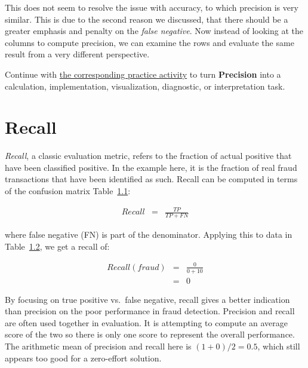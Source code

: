 \documentclass[
  letterpaper,
]{scrbook}
\begin{document}
This does not seem to resolve the issue with accuracy, to which
precision is very similar. This is due to the second reason we
discussed, that there should be a greater emphasis and penalty on the
\emph{false negative}. Now instead of looking at the columns to compute
precision, we can examine the rows and evaluate the same result from a
very different perspective.

\begin{tcolorbox}[enhanced jigsaw, arc=.35mm, bottomrule=.15mm, bottomtitle=1mm, breakable, colback=white, colbacktitle=quarto-callout-tip-color!10!white, colframe=quarto-callout-tip-color-frame, coltitle=black, left=2mm, leftrule=.75mm, opacityback=0, opacitybacktitle=0.6, rightrule=.15mm, title=\textcolor{quarto-callout-tip-color}{\faLightbulb}\hspace{0.5em}{Put it into practice}, titlerule=0mm, toprule=.15mm, toptitle=1mm]

Continue with \hyperref[sec-pr-14-precision]{the corresponding practice
activity} to turn \textbf{Precision} into a calculation, implementation,
visualization, diagnostic, or interpretation task.

\end{tcolorbox}

\section{Recall}\label{recall}

\emph{Recall}, a classic evaluation metric, refers to the fraction of
actual positive that have been classified positive. In the example here,
it is the fraction of real fraud transactions that have been identified
as such. Recall can be computed in terms of the confusion matrix
Table~\hyperref[tab-eval-cmatrix]{1.1}:

\[\begin{aligned}
  Recall
  & = & \frac{TP}{TP + FN}
\end{aligned}\]

where false negative (FN) is part of the denominator. Applying this to
data in Table~\hyperref[tab-eval-cmatrix0]{1.2}, we get a recall of:

\[\begin{aligned}
  Recall(fraud)
  & = & \frac{0}{0 + 10} \\
  & = & 0
\end{aligned}\]

By focusing on true positive vs.~false negative, recall gives a better
indication than precision on the poor performance in fraud detection.
Precision and recall are often used together in evaluation. It is
attempting to compute an average score of the two so there is only one
score to represent the overall performance. The arithmetic mean of
precision and recall here is \((1+0)/2 = 0.5\), which still appears too
good for a zero-effort solution.
\end{document}
